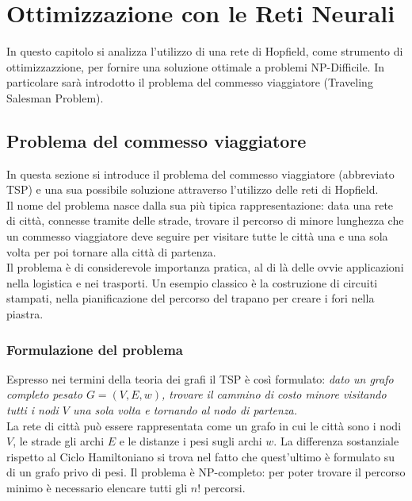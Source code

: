 \chapter{Ottimizzazione con le Reti Neurali} %
\label{cha:ottimizzazione_con_le_reti_neurali}
In questo capitolo si analizza l'utilizzo di una rete di Hopfield, come strumento di ottimizzazzione, per fornire una soluzione ottimale a problemi NP-Difficile. In particolare sarà introdotto il problema del commesso viaggiatore (Traveling Salesman Problem).

\section{Problema del commesso viaggiatore} %
\label{sec:problema_del_commesso_viaggiatore}
In questa sezione si introduce il problema del commesso viaggiatore (abbreviato TSP) e una sua possibile soluzione attraverso l'utilizzo delle reti di Hopfield.\\

Il nome del problema nasce dalla sua più tipica rappresentazione: data una rete di città, connesse tramite delle strade, trovare il percorso di minore lunghezza che un commesso viaggiatore deve seguire per visitare tutte le città una e una sola volta per poi tornare alla città di partenza.\\

Il problema è di considerevole importanza pratica, al di là delle ovvie applicazioni nella logistica e nei trasporti. Un esempio classico è la costruzione di circuiti stampati, nella pianificazione del percorso del trapano per creare i fori nella piastra.


\subsection{Formulazione del problema} %
\label{sub:formulazione_del_problema}
Espresso nei termini della teoria dei grafi il TSP è così formulato: \emph{dato un grafo completo pesato $G=(V, E, w)$, trovare il cammino di costo minore visitando tutti i nodi $V$ una sola volta e tornando al nodo di partenza.}\\

La rete di città può essere rappresentata come un grafo in cui le città sono i nodi $V$, le strade gli archi $E$ e le distanze i pesi sugli archi $w$. La differenza sostanziale rispetto al Ciclo Hamiltoniano si trova nel fatto che quest'ultimo è formulato su di un grafo privo di pesi. Il problema è NP-completo: per poter trovare il percorso minimo è necessario elencare tutti gli \textbf{$n!$} percorsi.

